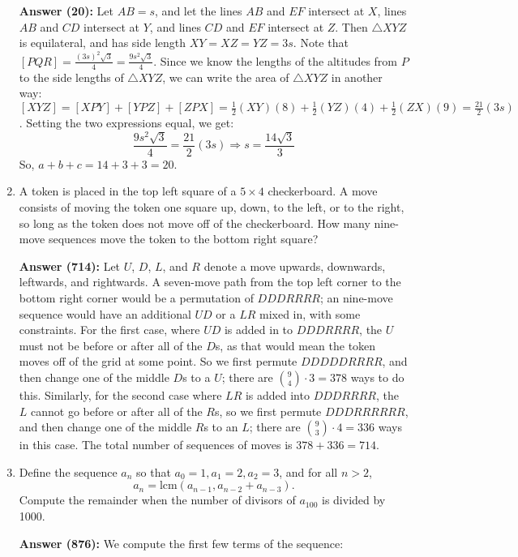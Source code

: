 \documentclass{article}
\begin{document}
\begin{enumerate}
\textbf{Answer (20):} Let $AB = s$, and let the lines $AB$ and $EF$ intersect at $X$, lines $AB$ and $CD$ intersect at $Y$, and lines $CD$ and $EF$ intersect at $Z$. Then $\triangle XYZ$ is equilateral, and has side length $XY = XZ = YZ = 3s$. Note that $[PQR] = \frac{(3s)^2\sqrt{3}}{4} = \frac{9s^2\sqrt{3}}{4}$. Since we know the lengths of the altitudes from $P$ to the side lengths of $\triangle XYZ$, we can write the area of $\triangle XYZ$ in another way: $[XYZ] = [XPY]+[YPZ]+[ZPX] = \frac{1}{2}(XY)(8) + \frac{1}{2}(YZ)(4) + \frac{1}{2}(ZX)(9) = \frac{21}{2}(3s)$. Setting the two expressions equal, we get: \[ \frac{9s^2\sqrt{3}}{4} = \frac{21}{2}(3s) \Rightarrow s = \frac{14\sqrt{3}}{3}\] So, $a+b+c = 14+3+3 = \boxed{20}$.

\newpage

\item A token is placed in the top left square of a $5 \times 4$ checkerboard. A move consists of moving the token one square up, down, to the left, or to the right, so long as the token does not move off of the checkerboard. How many nine-move sequences move the token to the bottom right square?

\textbf{Answer (714):} Let $U$, $D$, $L$, and $R$ denote a move upwards, downwards, leftwards, and rightwards. A seven-move path from the top left corner to the bottom right corner would be a permutation of $DDDRRRR$; an nine-move sequence would have an additional $UD$ or a $LR$ mixed in, with some constraints. For the first case, where $UD$ is added in to $DDDRRRR$, the $U$ must not be before or after all of the $D$s, as that would mean the token moves off of the grid at some point. So we first permute $DDDDDRRRR$, and then change one of the middle $D$s to a $U$; there are $\binom{9}{4} \cdot 3 = 378$ ways to do this. Similarly, for the second case where $LR$ is added into $DDDRRRR$, the $L$ cannot go before or after all of the $R$s, so we first permute $DDDRRRRRR$, and then change one of the middle $R$s to an $L$; there are $\binom{9}{3} \cdot 4 = 336$ ways in this case. The total number of sequences of moves is $378+336=\boxed{714}$.

\item Define the sequence $a_n$ so that $a_0=1, a_1=2, a_2=3$, and for all $n>2$, \[ a_n= \mathrm{lcm}(a_{n-1},a_{n-2}+a_{n-3}). \]
Compute the remainder when the number of divisors of $a_{100}$ is divided by 1000.

\textbf{Answer (876):} We compute the first few terms of the sequence:


\end{enumerate}
\end{document}
